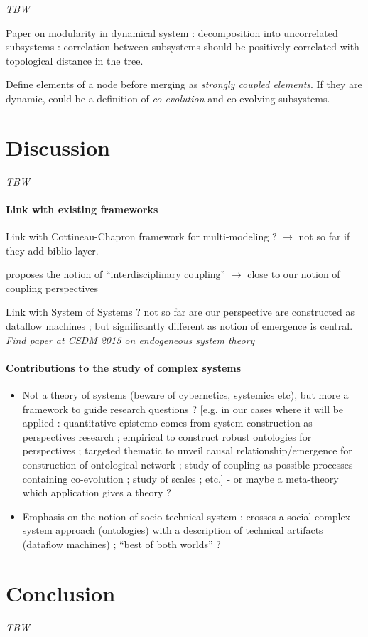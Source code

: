 \textit{TBW}

Paper on modularity in dynamical system : decomposition into uncorrelated subsystems : correlation between subsystems should be positively correlated with topological distance in the tree.

Define elements of a node before merging as \emph{strongly coupled elements}. If they are dynamic, could be a definition of \emph{co-evolution} and co-evolving subsystems.


\section*{Discussion}

\textit{TBW}

\paragraph{Link with existing frameworks}

Link with Cottineau-Chapron framework for multi-modeling ? $\rightarrow$ not so far if they add biblio layer.

\cite{reymond2013logique} proposes the notion of ``interdisciplinary coupling'' $\rightarrow$ close to our notion of coupling perspectives

Link with System of Systems ? not so far are our perspective are constructed as dataflow machines ; but significantly different as notion of emergence is central. \textit{Find paper at CSDM 2015 on endogeneous system theory}


\paragraph{Contributions to the study of complex systems}

\begin{itemize}
\item Not a theory of systems (beware of cybernetics, systemics etc), but more a framework to guide research questions ? [e.g. in our cases where it will be applied : quantitative epistemo comes from system construction as perspectives research ; empirical to construct robust ontologies for perspectives ; targeted thematic to unveil causal relationship/emergence for construction of ontological network ; study of coupling as possible processes containing co-evolution ; study of scales ; etc.] - or maybe a meta-theory which application gives a theory ?
\item Emphasis on the notion of socio-technical system : crosses a social complex system approach (ontologies) with a description of technical artifacts (dataflow machines) ; ``best of both worlds'' ? 
\end{itemize}






\section*{Conclusion}

\textit{TBW}









